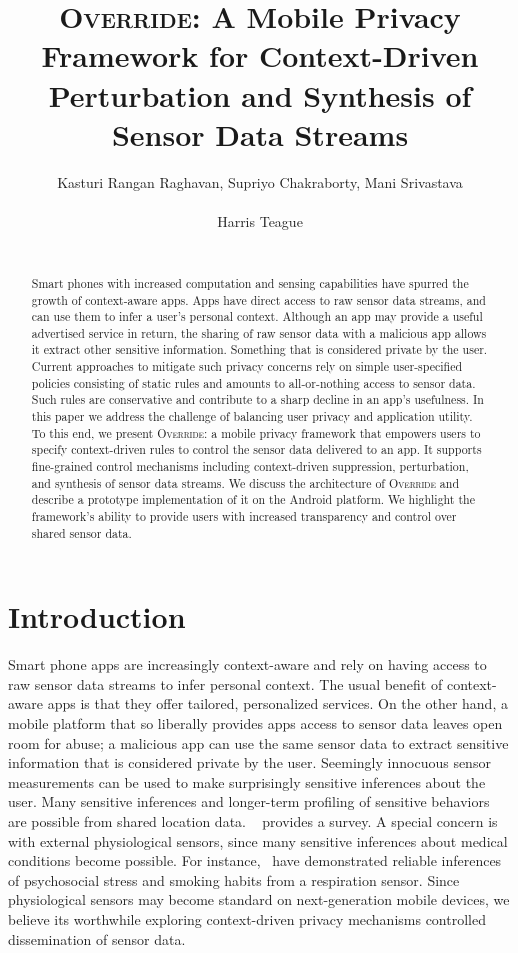 \documentclass[10pt]{sensys-proc}
\author{
\alignauthor Kasturi Rangan Raghavan, Supriyo Chakraborty, Mani Srivastava\\
	\affaddr{University of California, Los Angeles}\\
	\email{\{kasturir,supriyo,mani\}@ucla.edu}
\alignauthor Harris Teague\\
	\affaddr{Qualcomm Inc.}\\
	\email{hteague@qualcomm.com}
}
\title{\textsc{Override}: A Mobile Privacy Framework for Context-Driven
Perturbation and Synthesis of Sensor Data Streams}
\begin{document}
\maketitle

\begin{abstract}
Smart phones with increased computation and sensing capabilities have spurred the growth of context-aware apps. Apps have direct access to raw sensor data streams, and can use them to infer a user's personal context. Although an app may provide a useful advertised service in return, the sharing of raw sensor data with a malicious app allows it extract other sensitive information. Something that is considered private by the user. Current approaches to mitigate such privacy concerns rely on simple user-specified policies consisting of static rules and amounts to all-or-nothing access to sensor data. Such rules are conservative and contribute to a sharp decline in an app's usefulness. In this paper we address the challenge of balancing user privacy and application utility. To this end, we present \textsc{Override}: a mobile privacy framework that empowers users to specify context-driven rules to control the sensor data delivered to an app. It supports fine-grained control mechanisms including context-driven suppression, perturbation, and synthesis of sensor data streams. We discuss the architecture of \textsc{Override} and describe a prototype implementation of it on the Android platform. We highlight the framework's ability to provide users with increased transparency and control over shared sensor data.
\end{abstract}

\section{Introduction}
\label{sec:intro}
Smart phone apps are increasingly context-aware and rely on having access to raw sensor data streams to infer personal context. The usual benefit of context-aware apps is that they offer tailored, personalized services. On the other hand, a mobile platform that so liberally provides apps access to sensor data leaves open room for abuse; a malicious app can use the same sensor data to extract sensitive information that is considered private by the user. Seemingly innocuous sensor measurements can be used to make surprisingly sensitive inferences about the user. Many sensitive inferences and longer-term profiling of sensitive behaviors are possible from shared location data. ~\cite{krumm:survey} provides a survey. A special concern is with external physiological sensors, since many sensitive inferences about medical conditions become possible. For instance,~\cite{plarre:psychological,rahman:mConverse,Ertin:AutoSense} have demonstrated reliable inferences of psychosocial stress and smoking habits from a respiration sensor. Since physiological sensors may become standard on next-generation mobile devices, we believe its worthwhile exploring context-driven privacy mechanisms controlled dissemination of sensor data.
\end{document}
